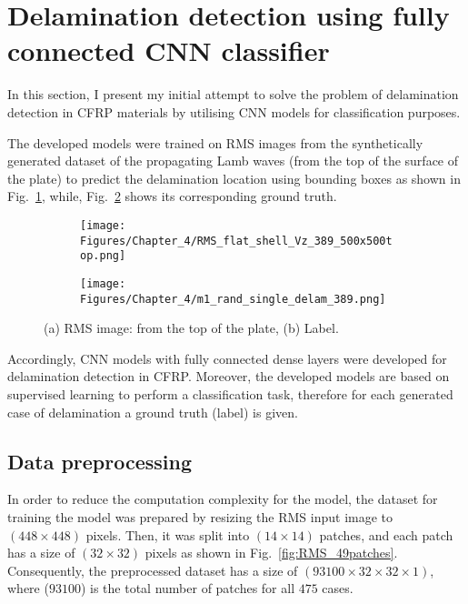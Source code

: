 \section{Delamination detection using fully connected CNN classifier}
\label{sec42}

In this section, I present my initial attempt to solve the problem of delamination detection in CFRP materials by utilising CNN models for classification purposes.

The developed models were trained on RMS images from the synthetically generated dataset of the propagating Lamb waves (from the top of the surface of the plate) to predict the delamination location using bounding boxes as shown in Fig.~\ref{fig:RMS_14}, while, Fig.~\ref{fig:label_14} shows its corresponding ground truth.
\begin{figure} [h!]
	\centering
	\begin{subfigure}[b]{0.47\textwidth}
		\centering
		\texttt{[image: Figures/Chapter\_4/RMS\_flat\_shell\_Vz\_389\_500x500top.png]}
		\caption{}
		\label{fig:RMS_14}
	\end{subfigure}
	\hfill
	\begin{subfigure}[b]{0.47\textwidth}
		\centering
		\texttt{[image: Figures/Chapter\_4/m1\_rand\_single\_delam\_389.png]}
		\caption{}
		\label{fig:label_14}
	\end{subfigure}
	\caption{(a) RMS image: from the top of the plate, (b) Label.}
	\label{fig:RMS_GT}
\end{figure} 

Accordingly, CNN models with fully connected dense layers were developed for delamination detection in CFRP.
Moreover, the developed models are based on supervised learning to perform a classification task, therefore for each generated case of delamination a ground truth (label) is given.
 
\subsection{Data preprocessing}
\label{sec421}
In order to reduce the computation complexity for the model, the dataset for training the model was prepared by resizing the RMS input image to \((448\times 448)\) pixels.  
Then, it was split into \((14\times 14)\) patches, and each patch has a size of \((32\times 32)\) pixels as shown in Fig.~\ref{fig:RMS_49patches}.
Consequently, the preprocessed dataset has a size of \((93100\times 32\times 32 \times 1)\), where (\(93100\)) is the total number of patches for all \(475\) cases.

